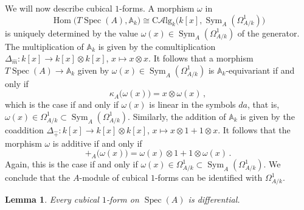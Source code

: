 \documentclass[12pt,reqno, a4paper]{amsart}
\numberwithin{equation}{section}
\theoremstyle{plain}
\newtheorem{Lemma}[Theorem]{Lemma}
\theoremstyle{definition}
\theoremstyle{remark}
\DeclareMathOperator{\Hom}{Hom}
\newcommand{\bbA}{\mathbb{A}}
\newcommand{\Rmult}{\hat{m}}
\newcommand{\Radd}{\hat{+}}
\newcommand{\CAlg}{{\mathrm{C}\mathcal{A}\mathrm{lg}}}
\DeclareMathOperator{\Sym}{Sym}
\DeclareMathOperator{\Spec}{Spec}
\begin{document}
We will now describe cubical $1$-forms. A morphism $\omega$ in
\begin{equation*}
  \Hom\bigl( T\Spec(A), \bbA_k \bigr)
  \cong \CAlg_k\bigl( k[x], \Sym_A(\Omega^1_{A/k})\bigr)
\end{equation*}
is uniquely determined by the value $\omega(x) \in \Sym_A(\Omega^1_{A/k})$ of the generator. The multiplication of $\bbA_k$ is given by the comultiplication $\Delta_{\Rmult}: k[x] \to k[x] \otimes k[x]$, $x \mapsto x \otimes x$. It follows that a morphism $T\Spec(A) \to \bbA_k$ given by $\omega(x) \in \Sym_A(\Omega^1_{A/k})$ is $\bbA_k$-equivariant if and only if
\begin{equation*}
  \kappa_A\bigl(\omega(x) \bigr)
  = x \otimes \omega(x)
  \,,
\end{equation*}
which is the case if and only if $\omega(x)$ is linear in the symbols $da$, that is, $\omega(x) \in \Omega^1_{A/k} \subset \Sym_A(\Omega^1_{A/k})$. Similarly, the addition of $\bbA_k$ is given by the coaddition $\Delta_{\Radd}: k[x] \to k[x] \otimes k[x]$, $x \mapsto x \otimes 1 + 1 \otimes x$. It follows that the morphism $\omega$ is additive if and only if
\begin{equation*}
  +_A\bigl(\omega(x)\bigr) = \omega(x) \otimes 1 + 1 \otimes \omega(x)
  \,.
\end{equation*}
Again, this is the case if and only if $\omega(x) \in \Omega^1_{A/k} \subset \Sym_A(\Omega^1_{A/k})$. We conclude that the $A$-module of cubical $1$-forms can be identified with $\Omega^1_{A/k}$.

\begin{Lemma}
\label{lem:Schemes1}
Every cubical $1$-form on $\Spec(A)$ is differential.
\end{Lemma}
\end{document}
